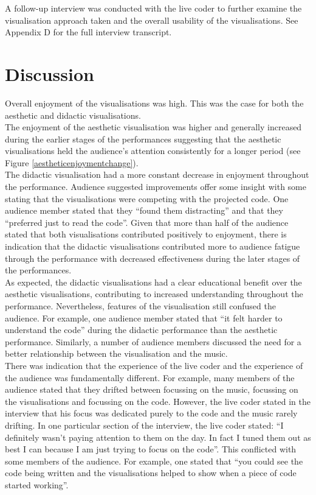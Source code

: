 A follow-up interview was conducted with the live coder to further examine the visualisation approach taken and the overall usability of the visualisations. See Appendix D for the full interview transcript.

\section{Discussion}

Overall enjoyment of the visualisations was high. This was the case for both the aesthetic and didactic visualisations.\\

The enjoyment of the aesthetic visualisation was higher and generally increased during the earlier stages of the performances suggesting that the aesthetic visualisations held the audience's attention consistently for a longer period (see Figure \ref{aestheticenjoymentchange}).\\

The didactic visualisation had a more constant decrease in enjoyment throughout the performance. Audience suggested improvements offer some insight with some stating that the visualisations were competing with the projected code. One audience member stated that they ``found them distracting'' and that they ``preferred just to read the code''. Given that more than half of the audience stated that both visualisations contributed positively to enjoyment, there is indication that the didactic visualisations contributed more to audience fatigue through the performance with decreased effectiveness during the later stages of the performances.\\

As expected, the didactic visualisations had a clear educational benefit over the aesthetic visualisations, contributing to increased understanding throughout the performance. Nevertheless, features of the visualisation still confused the audience. For example, one audience member stated that ``it felt harder to understand the code'' during the didactic performance than the aesthetic performance. Similarly, a number of audience members discussed the need for a better relationship between the visualisation and the music.\\

There was indication that the experience of the live coder and the experience of the audience was fundamentally different. For example, many members of the audience stated that they drifted between focussing on the music, focussing on the visualisations and focussing on the code. However, the live coder stated in the interview that his focus was dedicated purely to the code and the music rarely drifting. In one particular section of the interview, the live coder stated: ``I definitely wasn't paying attention to them on the day. In fact I tuned them out as best I can because I am just trying to focus on the code''. This conflicted with some members of the audience. For example, one stated that ``you could see the code being written and the visualisations helped to show when a piece of code started working''. \\

